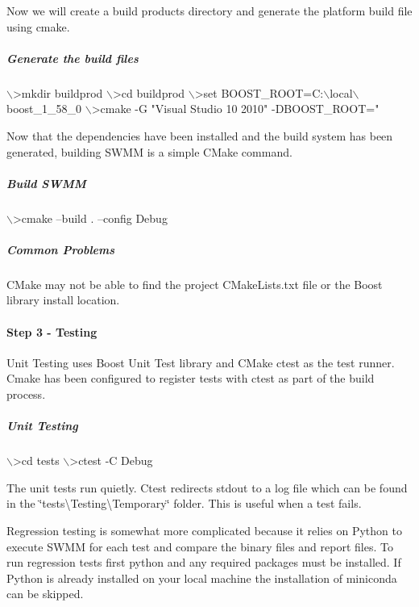 Now we will create a build products directory and generate the platform build file using cmake.

\subparagraph*{Generate the build files}


\begin{DoxyCode}
\(\backslash\)>mkdir buildprod
\(\backslash\)>cd buildprod
\(\backslash\)>set BOOST\_ROOT=C:\(\backslash\)local\(\backslash\)boost\_1\_58\_0
\(\backslash\)>cmake -G "Visual Studio 10 2010" -DBOOST\_ROOT="%
\end{DoxyCode}


Now that the dependencies have been installed and the build system has been generated, building S\+W\+MM is a simple C\+Make command.

\subparagraph*{Build S\+W\+MM}


\begin{DoxyCode}
\(\backslash\)>cmake --build . --config Debug
\end{DoxyCode}


\subparagraph*{Common Problems}

C\+Make may not be able to find the project C\+Make\+Lists.\+txt file or the Boost library install location.

\paragraph*{Step 3 -\/ Testing}

Unit Testing uses Boost Unit Test library and C\+Make ctest as the test runner. Cmake has been configured to register tests with ctest as part of the build process.

\subparagraph*{Unit Testing}


\begin{DoxyCode}
\(\backslash\)>cd tests
\(\backslash\)>ctest -C Debug
\end{DoxyCode}


The unit tests run quietly. Ctest redirects stdout to a log file which can be found in the \char`\"{}tests\textbackslash{}\+Testing\textbackslash{}\+Temporary\char`\"{} folder. This is useful when a test fails.

Regression testing is somewhat more complicated because it relies on Python to execute S\+W\+MM for each test and compare the binary files and report files. To run regression tests first python and any required packages must be installed. If Python is already installed on your local machine the installation of miniconda can be skipped.

